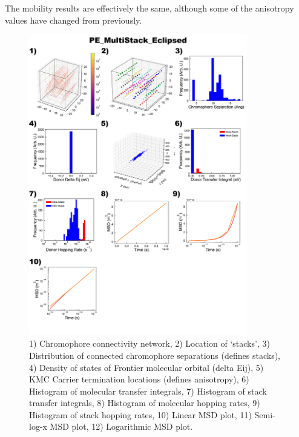 \documentclass[12pt]{article}
\begin{document}
\clearpage


The mobility results are effectively the same, although some of the anisotropy values have changed from previously.


\begin{figure}[h]\centering
	\includegraphics[width=0.85\textwidth]{Figures/PE_MultiStack_Eclipsed.png}
    \caption{   1) Chromophore connectivity network, 
                2) Location of `stacks', 
                3) Distribution of connected chromophore separations (defines stacks),
                4) Density of states of Frontier molecular orbital (delta Eij),
                5) KMC Carrier termination locations (defines anisotropy),
                6) Histogram of molecular transfer integrals,
                7) Histogram of stack transfer integrals,
                8) Histogram of molecular hopping rates,
                9) Histogram of stack hopping rates,
                10) Linear MSD plot,
                11) Semi-log-x MSD plot,
                12) Logarithmic MSD plot.}
	\label{fig:PEMultEcl}
\end{figure}
\end{document}
